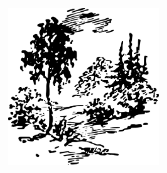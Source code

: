 \begin{center}
\includegraphics[width=0.3\textwidth]{figures/ch-01/fig-ch-01-tail.pdf}
\end{center}


















